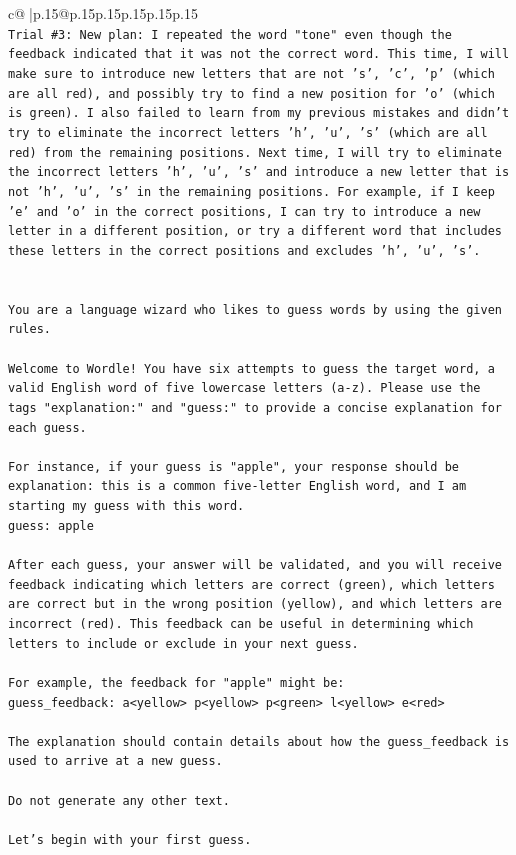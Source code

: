 \documentclass{article}
\begin{document}
{\begin{supertabular}{c@{$\;$}|p{.15\linewidth}@{}p{.15\linewidth}p{.15\linewidth}p{.15\linewidth}p{.15\linewidth}p{.15\linewidth}}
{{{\\ 
\texttt{Trial \#3: New plan: I repeated the word "tone" even though the feedback indicated that it was not the correct word. This time, I will make sure to introduce new letters that are not 's', 'c', 'p' (which are all red), and possibly try to find a new position for 'o' (which is green). I also failed to learn from my previous mistakes and didn't try to eliminate the incorrect letters 'h', 'u', 's' (which are all red) from the remaining positions. Next time, I will try to eliminate the incorrect letters 'h', 'u', 's' and introduce a new letter that is not 'h', 'u', 's' in the remaining positions. For example, if I keep 'e' and 'o' in the correct positions, I can try to introduce a new letter in a different position, or try a different word that includes these letters in the correct positions and excludes 'h', 'u', 's'.} \\
\\ 
\\ 
\texttt{You are a language wizard who likes to guess words by using the given rules.} \\
\\ 
\texttt{Welcome to Wordle! You have six attempts to guess the target word, a valid English word of five lowercase letters (a{-}z). Please use the tags "explanation:" and "guess:" to provide a concise explanation for each guess.} \\
\\ 
\texttt{For instance, if your guess is "apple", your response should be} \\
\texttt{explanation: this is a common five{-}letter English word, and I am starting my guess with this word.} \\
\texttt{guess: apple} \\
\\ 
\texttt{After each guess, your answer will be validated, and you will receive feedback indicating which letters are correct (green), which letters are correct but in the wrong position (yellow), and which letters are incorrect (red). This feedback can be useful in determining which letters to include or exclude in your next guess.} \\
\\ 
\texttt{For example, the feedback for "apple" might be:} \\
\texttt{guess\_feedback: a<yellow> p<yellow> p<green> l<yellow> e<red>} \\
\\ 
\texttt{The explanation should contain details about how the guess\_feedback is used to arrive at a new guess.} \\
\\ 
\texttt{Do not generate any other text.} \\
\\ 
\texttt{Let's begin with your first guess.} \\
            }
        }
    }
     \\ \\


\end{supertabular}}
\end{document}

